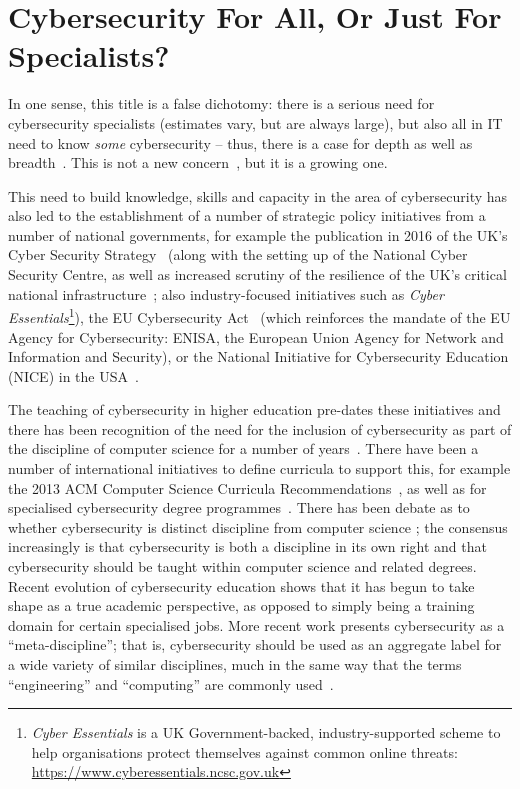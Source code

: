 \documentclass[conference]{IEEEtran}
\begin{document}
\section{Cybersecurity For All, Or Just For Specialists?}

In one sense, this title is a false dichotomy: there is a serious need for cybersecurity specialists (estimates vary, but are always large), but also all in IT need to know \emph{some} cybersecurity -- thus, there is a case for depth as well as breadth~\cite{manson+pike:2014,davenport-et-al:latice2016}. This is not a new concern~\cite{Parr2014a}, but it is a growing one.

This need to build knowledge, skills and capacity in the area of cybersecurity has also led to the establishment of a number of strategic policy initiatives from a number of national governments, for example the publication in 2016 of the UK's Cyber Security Strategy~\cite{ukcyberstrategy:2016} (along with the setting up of the National Cyber Security Centre, as well as increased scrutiny of the resilience of the UK's critical national infrastructure~\cite{lordscyberreport:2018}; also industry-focused initiatives such as {\emph{Cyber Essentials}}\footnote{{\emph{Cyber Essentials}} is a UK Government-backed, industry-supported scheme to help organisations protect themselves against common online threats: \url{https://www.cyberessentials.ncsc.gov.uk}}), the EU Cybersecurity Act~\cite{eucyber2018} (which reinforces the mandate of the EU Agency for Cybersecurity: ENISA, the European Union Agency for Network and Information and Security), or the National Initiative for Cybersecurity Education (NICE) in the USA~\cite{NICE}.

The teaching of cybersecurity in higher education pre-dates these initiatives and there has been recognition of the need for the inclusion of cybersecurity as part of the discipline of computer science for a number of years~\cite{Hentea2006,schneider2013}. There have been a number of international initiatives to define curricula to support this, for example the 2013 ACM Computer Science Curricula Recommendations~\cite[which added ``{\emph{Information Assurance and Security}}'' for the first time]{ACM2013a}, as well as for specialised cybersecurity degree programmes~\cite{ACMIEEEAISSIGSECIFIP}. There has been debate as to whether cybersecurity is distinct discipline from computer science \cite{McGettrick2013}; the consensus increasingly is that cybersecurity is both a discipline in its own right and that cybersecurity should be taught within computer science and related degrees. Recent evolution of cybersecurity education shows that it has begun to take shape as a true academic perspective, as opposed to simply being a training domain for certain specialised jobs. More recent work presents cybersecurity as a ``meta-discipline''; that is, cybersecurity should be used as an aggregate label for a wide variety of similar disciplines, much in the same way that the terms ``engineering'' and ``computing'' are commonly used~\cite{Parrishetal2018b}. 
\end{document}
